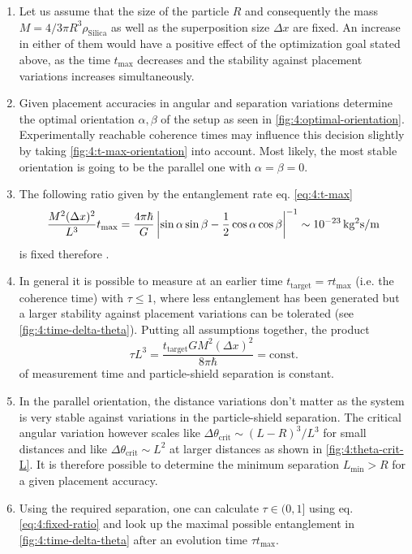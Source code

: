 \begin{enumerate}
  \item Let us assume that the size of the particle $R$ and consequently the mass $M=4/3 \pi R^3 \rho_\mathrm{Silica}$ as well as the superposition size $\Delta x$ are fixed. An increase in either of them would have a positive effect of the optimization goal stated above, as the time $t_\mathrm{max}$ decreases and the stability against placement variations increases simultaneously.
  \item Given placement accuracies in angular and separation variations determine the optimal orientation $\alpha,\beta$ of the setup as seen in \cref{fig:4:optimal-orientation}. Experimentally reachable coherence times may influence this decision slightly by taking \cref{fig:4:t-max-orientation} into account. Most likely, the most stable orientation is going to be the parallel one with $\alpha = \beta = 0$.
  \item The following ratio given by the entanglement rate eq. \eqref{eq:4:t-max}
  \begin{equation}
    \frac{M^2 (\Delta x)^2}{L^3}t_\mathrm{max} = \frac{4 \pi \hbar}{G}\left\lvert\sin\alpha\sin\beta-\frac{1}{2}\cos\alpha\cos\beta\right\rvert^{-1} \sim 10^{-23} \, \mathrm{kg^2 s/m}
  \end{equation} 
  is fixed therefore \cite{Aspelmeyer_2024}.
  \item In general it is possible to measure at an earlier time $t_\mathrm{target} = \tau t_\mathrm{max}$ (i.e. the coherence time) with $\tau \leq 1$, where less entanglement has been generated but a larger stability against placement variations can be tolerated (see \cref{fig:4:time-delta-theta}). Putting all assumptions together, the product
  \begin{equation}\label{eq:4:fixed-ratio}
    \tau L^3 = \frac{t_\mathrm{target} G M^2 (\Delta x)^2}{8\pi \hbar} = \mathrm{const.}
  \end{equation}
  of measurement time and particle-shield separation is constant.
  \item In the parallel orientation, the distance variations don't matter as the system is very stable against variations in the particle-shield separation. The critical angular variation however scales like $\Delta \theta_\mathrm{crit} \sim (L-R)^3/L^3$ for small distances and like $\Delta \theta_\mathrm{crit} \sim L^2$ at larger distances as shown in \cref{fig:4:theta-crit-L}. It is therefore possible to determine the minimum separation $L_\mathrm{min} > R$ for a given placement accuracy.
  \item Using the required separation, one can calculate $\tau \in (0, 1]$ using eq. \eqref{eq:4:fixed-ratio} and look up the maximal possible entanglement in \cref{fig:4:time-delta-theta} after an evolution time $\tau t_\mathrm{max}$.
\end{enumerate}
